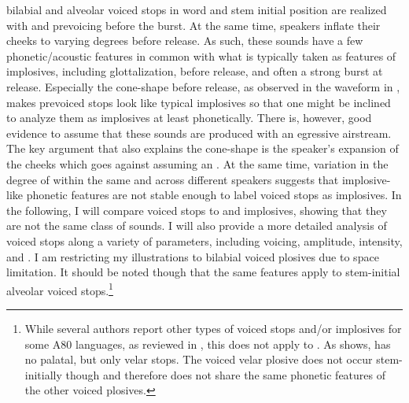 \documentclass[output=paper]{LSP/langsci}
\begin{document}
 bilabial and alveolar voiced stops in word and stem initial position are realized with  and prevoicing before the burst. At the same time, speakers inflate their cheeks to varying degrees before release.   As such, these sounds have a few phonetic/acoustic features in common with what is typically taken as features of implosives, including glottalization,  before release, and often a strong burst at release. Especially the cone-shape  before release, as observed in the waveform in , makes  prevoiced stops look like typical implosives so that one might be inclined to analyze them as implosives at least phonetically. There is, however, good evidence to assume that these sounds are produced with an egressive airstream. The key argument that also explains the cone-shape  is the speaker's expansion of the cheeks which goes against assuming an . At the same time, variation in the degree of  within the same and across different speakers suggests that implosive-like phonetic features are not stable enough to label  voiced stops as implosives. In the following, I will compare  voiced stops to  and  implosives, showing that they are not the same class of sounds. I will also provide a more detailed analysis of  voiced stops along a variety of parameters, including voicing, amplitude, intensity, and . I am restricting my illustrations to bilabial voiced plosives due to space limitation. It should be noted though that the same features apply to stem-initial alveolar voiced stops.\footnote{While several authors report other types of voiced stops and/or implosives for some A80 languages, as reviewed in , this does not apply to . As \citet{Grimm2015} shows,  has no palatal, but only velar stops. The voiced velar plosive does not occur stem-initially though and therefore does not share the same phonetic features of the other voiced plosives.} 
\end{document}
